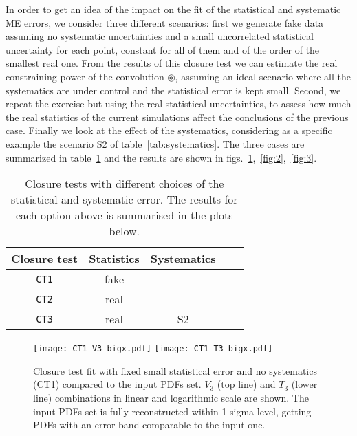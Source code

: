 In order to get an idea of the impact on the fit of the statistical and
systematic ME errors, we consider three different scenarios: first we generate
fake data assuming no systematic uncertainties and a small uncorrelated
statistical uncertainty for each point, constant for all of them and of the order of the
smallest real one. From the results of this closure test we can estimate the
real constraining power of the convolution $\circledast$, assuming an ideal
scenario where all the systematics are under control and the statistical error
is kept small. Second, we repeat the exercise but using the real statistical
uncertainties, to assess how much the real statistics of the current simulations
affect the conclusions of the previous case. Finally we look at the effect of
the systematics, considering as a specific example the scenario S2 of
table~\ref{tab:systematics}. The three cases are summarized in
table~\ref{tab:CT} and the results are shown in
figs.~\ref{fig:1},~\ref{fig:2},~\ref{fig:3}.
%
\begin{table}[h]
\begin{center}
\begin{tabular}{|c|c|c|c|c|}
\hline
Closure test & Statistics & Systematics \\
\hline
{\tt CT1} & fake & - \\
{\tt CT2} & real & - \\
{\tt CT3}  & real  & S2\\
\hline
\end{tabular}
\end{center}
\caption{\label{tab:CT} Closure tests with different choices of the statistical and systematic error. The results for each option above is summarised in the plots below.}
\end{table}

\begin{figure}[h]
    \begin{center}
	\texttt{[image: CT1\_V3\_bigx.pdf]}  
	\texttt{[image: CT1\_T3\_bigx.pdf]}  
	\caption{Closure test fit with fixed small statistical error and no systematics (CT1) compared to the input PDFs set. 
		$V_3$ (top line) and $T_3$ (lower line) combinations in linear and logarithmic scale are shown.
	The input PDFs set is fully reconstructed within 1-sigma level, getting PDFs with an error band comparable to the input one.}
    \label{fig:1}
    \end{center}
\end{figure}
    
